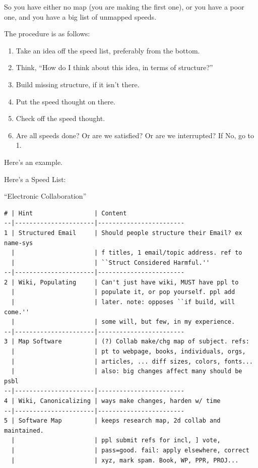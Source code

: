\documentclass[oneside]{book}
\begin{document}
So you have either no map (you are making the first one), or you have
a poor one, and you have a big list of unmapped speeds.

The procedure is as follows:

\begin{enumerate}
\item Take an idea off the speed list, preferably from the bottom.
\item Think, ``How do I think about this idea, in terms of structure?''
\item Build missing structure, if it isn't there.
\item Put the speed thought on there.
\item Check off the speed thought.
\item Are all speeds done? Or are we satisfied? Or are we interrupted?
   If No, go to 1.
 \end{enumerate}

Here's an example.

Here's a Speed List:

``Electronic Collaboration''

\begin{verbatim}
# | Hint                 | Content
--|----------------------|------------------------
1 | Structured Email     | Should people structure their Email? ex name-sys
  |                      | f titles, 1 email/topic address. ref to
  |                      | ``Struct Considered Harmful.''
--|----------------------|------------------------
2 | Wiki, Populating     | Can't just have wiki, MUST have ppl to
  |                      | populate it, or pop yourself. ppl add
  |                      | later. note: opposes ``if build, will come.''
  |                      | some will, but few, in my experience.
--|----------------------|------------------------
3 | Map Software         | (?) Collab make/chg map of subject. refs:
  |                      | pt to webpage, books, individuals, orgs,
  |                      | articles, ... diff sizes, colors, fonts...
  |                      | also: big changes affect many should be psbl
--|----------------------|------------------------
4 | Wiki, Canonicalizing | ways make changes, harden w/ time
--|----------------------|------------------------
5 | Software Map         | keeps research map, 2d collab and maintained.
  |                      | ppl submit refs for incl, ] vote,
  |                      | pass=good. fail: apply elsewhere, correct
  |                      | xyz, mark spam. Book, WP, PPR, PROJ...
\end{verbatim}
\end{document}
